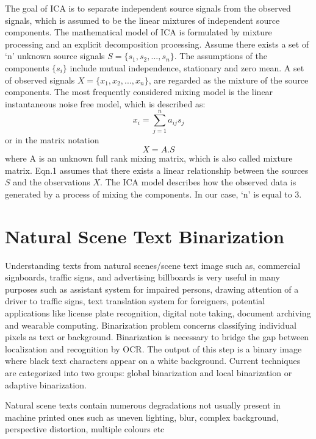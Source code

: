 The goal of ICA is to separate independent 
source signals from the observed signals, which is assumed 
to be the linear mixtures of independent source components. 
The mathematical model of ICA is formulated by 
mixture processing and an explicit decomposition processing.  
Assume there exists a set of `n' unknown source signals 
$S=\{s_1, s_2,..., s_n \}$. The assumptions of the components 
$\{s_i\}$  include mutual independence, stationary and zero mean. 
A set of observed signals $X=\{x_1,x_2,...,x_n\}$, are regarded as the mixture of the source 
components. The most frequently considered 
mixing model is the linear instantaneous noise free model,
which is described as: 
\begin{equation}
x_i=\sum_{j=1}^{n}a_{ij}s_j 
\end{equation}or in the matrix notation
\begin{equation}
X=A.S  
\end{equation}where A is an unknown full rank mixing matrix, which is 
also called mixture matrix. Eqn.1 assumes that there exists a 
linear relationship between the sources $S$ and the observations 
$X$. The ICA model describes how the observed data is 
generated by a process of mixing the components. In our case, `n' is equal to 3. 


\section{Natural Scene Text Binarization}
Understanding texts from natural scenes/scene text image 
such as, commercial signboards, traffic signs, and advertising 
billboards is very useful in many purposes such as assistant 
system for impaired persons, drawing attention of a driver to 
traffic signs, text translation system for foreigners, potential 
applications like license plate recognition, digital note taking, 
document archiving and wearable computing. Binarization 
problem concerns classifying individual pixels as text or 
background. Binarization is necessary to bridge the gap 
between localization and recognition by OCR. The output of 
this step is a binary image where black text characters appear 
on a white background. Current techniques are categorized into 
two groups: global binarization and local binarization or 
adaptive binarization.

Natural scene texts contain numerous degradations not
usually present in machine printed ones such as uneven
lighting, blur, complex background, perspective distortion,
multiple colours etc

